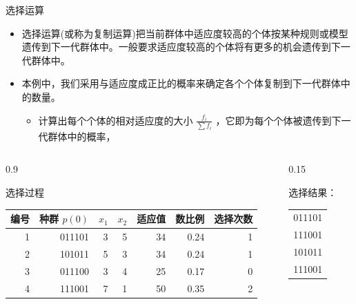 \documentclass[presentation]{beamer}
\begin{document}
\begin{frame}[label={sec:org681f1cc}]{选择运算}
\begin{itemize}
\item <2-> 选择运算(或称为复制运算)把当前群体中适应度较高的个体按某种规则或模型遗传到下一代群体中。一般要求适应度较高的个体将有更多的机会遗传到下一代群体中。
\item <3-> 本例中，我们采用与适应度成正比的概率来确定各个个体复制到下一代群体中的数量。
\begin{itemize}
\item 计算出每个个体的相对适应度的大小 \(\frac{f_i}{\sum f_i}\) ，它即为每个个体被遗传到下一代群体中的概率，
\end{itemize}
\end{itemize}
\begin{columns}
\begin{column}{0.9\columnwidth}
\begin{block}{选择过程}
\begin{center}
\begin{tabular}{rrrrrrr}
编号 & 种群 \(p(0)\) & \(x_1\) & \(x_2\) & 适应值 & 数比例 & 选择次数\\
\hline
1 & 011101 & 3 & 5 & 34 & 0.24 & 1\\
2 & 101011 & 5 & 3 & 34 & 0.24 & 1\\
3 & 011100 & 3 & 4 & 25 & 0.17 & 0\\
4 & 111001 & 7 & 1 & 50 & 0.35 & 2\\
\end{tabular}
\end{center}
\end{block}
\end{column}
\begin{column}{0.15\columnwidth}
\begin{block}{选择结果：}
\begin{center}
\begin{tabular}{r}
011101\\
111001\\
101011\\
111001\\
\end{tabular}
\end{center}
\end{block}
\end{column}
\end{columns}
\end{frame}
\end{document}
